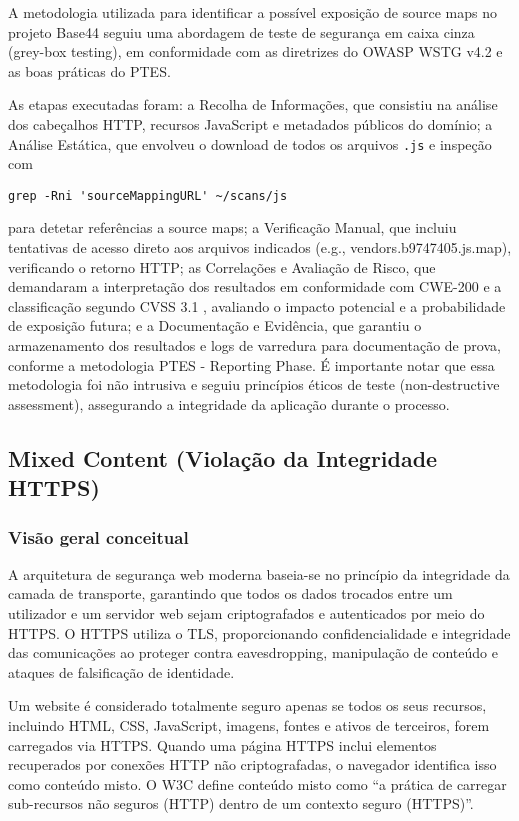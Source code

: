 A metodologia utilizada para identificar a possível exposição de source maps no projeto Base44 seguiu uma abordagem de teste de segurança em caixa cinza (grey-box testing), em conformidade com as diretrizes do OWASP WSTG v4.2 \cite{ref8} e as boas práticas do PTES. 

As etapas executadas foram: a Recolha de Informações, que consistiu na análise dos cabeçalhos HTTP, recursos JavaScript e metadados públicos do domínio; a Análise Estática, que envolveu o download de todos os arquivos \texttt{.js} e inspeção com  

\begin{verbatim}
grep -Rni 'sourceMappingURL' ~/scans/js
\end{verbatim}

para detetar referências a source maps; a Verificação Manual, que incluiu tentativas de acesso direto aos arquivos indicados (e.g., vendors.b9747405.js.map), verificando o retorno HTTP; as Correlações e Avaliação de Risco, que demandaram a interpretação dos resultados em conformidade com CWE-200 \cite{ref43} e a classificação segundo CVSS 3.1 \cite{ref46}, avaliando o impacto potencial e a probabilidade de exposição futura; e a Documentação e Evidência, que garantiu o armazenamento dos resultados e logs de varredura para documentação de prova, conforme a metodologia PTES - Reporting Phase. É importante notar que essa metodologia foi não intrusiva e seguiu princípios éticos de teste (non-destructive assessment), assegurando a integridade da aplicação durante o processo. 

\subsection{Mixed Content (Violação da Integridade HTTPS)}

\subsubsection{Visão geral conceitual}

A arquitetura de segurança web moderna baseia-se no princípio da integridade da camada de transporte, garantindo que todos os dados trocados entre um utilizador e um servidor web sejam criptografados e autenticados por meio do HTTPS. O HTTPS utiliza o TLS, proporcionando confidencialidade e integridade das comunicações ao proteger contra eavesdropping, manipulação de conteúdo e ataques de falsificação de identidade. \cite{ref48}

Um website é considerado totalmente seguro apenas se todos os seus recursos, incluindo HTML, CSS, JavaScript, imagens, fontes e ativos de terceiros, forem carregados via HTTPS. Quando uma página HTTPS inclui elementos recuperados por conexões HTTP não criptografadas, o navegador identifica isso como conteúdo misto. O W3C define conteúdo misto como “a prática de carregar sub-recursos não seguros (HTTP) dentro de um contexto seguro (HTTPS)”. \cite{ref50}

